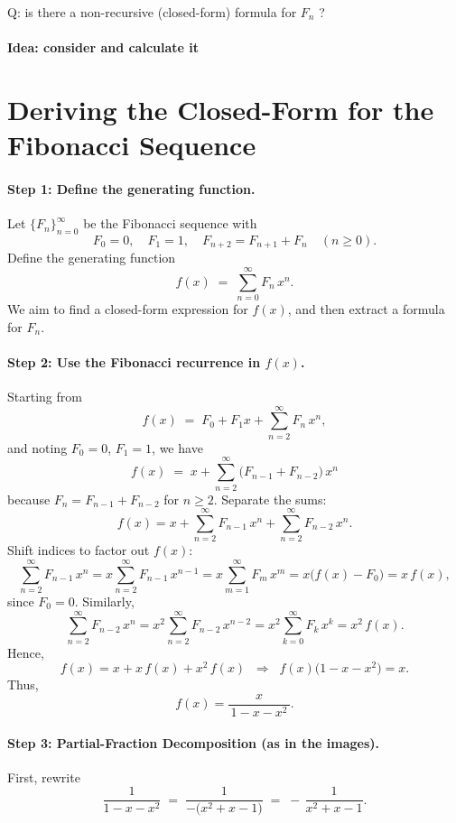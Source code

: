 \documentclass{article}
\begin{document}
Q: is there a non-recursive (closed-form) formula for \(F_n\) ?
\paragraph{Idea: consider and calculate it}

\section{Deriving the Closed-Form for the Fibonacci Sequence}

\paragraph{Step 1: Define the generating function.}
Let \(\{F_n\}_{n=0}^{\infty}\) be the Fibonacci sequence with 
\[
F_0 = 0, \quad F_1 = 1, \quad F_{n+2} = F_{n+1} + F_n \quad (n \ge 0).
\]
Define the generating function
\[
f(x) \;=\; \sum_{n=0}^{\infty} F_n\,x^n.
\]
We aim to find a closed-form expression for \(f(x)\), and then extract a formula for \(F_n\).

\paragraph{Step 2: Use the Fibonacci recurrence in \(f(x)\).}
Starting from
\[
f(x) \;=\; F_0 + F_1 x + \sum_{n=2}^{\infty} F_n\,x^n,
\]
and noting \(F_0=0\), \(F_1=1\), we have
\[
f(x) \;=\; x + \sum_{n=2}^{\infty} \bigl(F_{n-1} + F_{n-2}\bigr)\,x^n
\]
because \(F_n = F_{n-1} + F_{n-2}\) for \(n\ge2\). Separate the sums:
\[
f(x)
= x
+ \sum_{n=2}^{\infty} F_{n-1}\,x^n
+ \sum_{n=2}^{\infty} F_{n-2}\,x^n.
\]
Shift indices to factor out \(f(x)\):
\[
\sum_{n=2}^{\infty} F_{n-1}\,x^n 
= x \sum_{n=2}^{\infty} F_{n-1}\,x^{n-1} 
= x \sum_{m=1}^{\infty} F_m\,x^m 
= x \bigl(f(x) - F_0\bigr) 
= x\,f(x),
\]
since \(F_0=0\). Similarly,
\[
\sum_{n=2}^{\infty} F_{n-2}\,x^n 
= x^2 \sum_{n=2}^{\infty} F_{n-2}\,x^{n-2}
= x^2 \sum_{k=0}^{\infty} F_k\,x^k
= x^2\,f(x).
\]
Hence,
\[
f(x) = x + x\,f(x) + x^2\,f(x) 
\;\;\Longrightarrow\;\;
f(x)\bigl(1 - x - x^2\bigr) = x.
\]
Thus,
\[
f(x) = \frac{x}{\,1 - x - x^2\,}.
\]

\paragraph{Step 3: Partial-Fraction Decomposition (as in the images).}

First, rewrite
\[
\frac{1}{1 - x - x^2}
\;=\;
\frac{1}{-\bigl(x^2 + x - 1\bigr)}
\;=\;
-\,\frac{1}{x^2 + x - 1}.
\]
\end{document}
